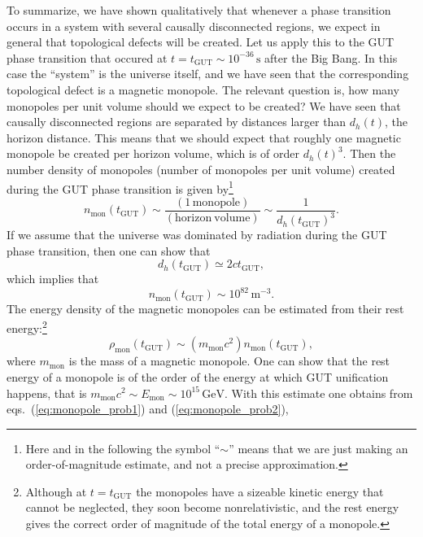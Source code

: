 To summarize, we have shown qualitatively that whenever a phase transition occurs in a system with several causally disconnected regions, we expect in general that topological defects will be created. Let us apply this to the GUT phase transition that occured at $t=t_{\mathrm{GUT}}\sim 10^{-36}\,{\mathrm{s}}$ after the Big Bang. In this case the ``system'' is the universe itself, and we have seen that the corresponding topological defect is a magnetic monopole. The relevant question is, how many monopoles per unit volume should we expect to be created? We have seen that causally disconnected regions are separated by distances larger than $d_h(t)$, the horizon distance. This means that we should expect that roughly one magnetic monopole be created per horizon volume, which is of order $d_h(t)^3$. Then the number density of monopoles (number of monopoles per unit volume) created during the GUT phase transition is given by\footnote{Here and in the following the symbol ``$\sim$'' means that we are just making an 
order-of-magnitude estimate, and not a precise approximation.}
\begin{equation}
n_{\mathrm{mon}}(t_{\mathrm{GUT}})\sim \frac{(\mathrm{1\,monopole})}{(\mathrm{horizon~volume})}\sim \frac{1}{d_h(t_{\mathrm{GUT}})^3}.
\end{equation}
If we assume that the universe was dominated by radiation during the GUT phase transition, then one can show that
\begin{equation} \label{eq:horizon_dist_rad}
d_h(t_{\mathrm{GUT}})\simeq 2ct_{\mathrm{GUT}},
\end{equation}
which implies that
\begin{equation} \label{eq:monopole_prob1}
n_{\mathrm{mon}}(t_{\mathrm{GUT}})\sim 10^{82}\,\mathrm{m^{-3}}.
\end{equation}
The energy density of the magnetic monopoles can be estimated from their rest energy:\footnote{Although at $t=t_{\mathrm{GUT}}$ the monopoles have a sizeable kinetic energy that cannot be neglected, they soon become nonrelativistic, and the rest energy gives the correct order of magnitude of the total energy of a monopole.}
\begin{equation} \label{eq:monopole_prob2}
\rho_{\mathrm{mon}}(t_{\mathrm{GUT}})\sim (m_{\mathrm{mon}}c^2)n_{\mathrm{mon}}(t_{\mathrm{GUT}}),
\end{equation}
where $m_{\mathrm{mon}}$ is the mass of a magnetic monopole. One can show that the rest energy of a monopole is of the order of the energy at which GUT unification happens, that is $m_{\mathrm{mon}}c^2\sim E_{\mathrm{mon}}\sim10^{15}\,{\mathrm{GeV}}$. With this estimate one obtains from eqs.\ (\ref{eq:monopole_prob1}) and (\ref{eq:monopole_prob2}),
